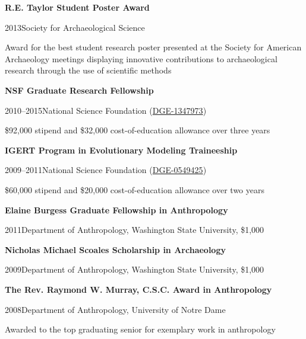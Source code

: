 {\bf R.E. Taylor Student Poster Award}
\begin{list1}
\item[] 2013\hspace{.2cm}Society for Archaeological Science
\item[] Award for the best student research poster presented at the Society for American Archaeology meetings displaying innovative contributions to archaeological research through the use of scientific methods
\end{list1}


{\bf NSF Graduate Research Fellowship}
\begin{list1}
\item[] 2010–2015\hspace{.2cm}National Science Foundation (\href{https://www.nsf.gov/awardsearch/showAward?AWD_ID=1347973}{DGE-1347973})
\item[] \$92,000 stipend and \$32,000 cost-of-education allowance over three years
\end{list1}


{\bf IGERT Program in Evolutionary Modeling Traineeship}
\begin{list1}
\item[] 2009–2011\hspace{.2cm}National Science Foundation (\href{https://grantome.com/grant/NSF/DGE-0549425}{DGE-0549425})
\item[] \$60,000 stipend and \$20,000 cost-of-education allowance over two years
\end{list1}


{\bf Elaine Burgess Graduate Fellowship in Anthropology} 
\begin{list1}
\item[] 2011\hspace{.2cm}Department of Anthropology, Washington State University, \$1,000
\end{list1}


{\bf Nicholas Michael Scoales Scholarship in Archaeology}
\begin{list1}
\item[] 2009\hspace{.2cm}Department of Anthropology, Washington State University, \$1,000
\end{list1}


{\bf The Rev. Raymond W. Murray, C.S.C. Award in Anthropology}
\begin{list1}
\item[] 2008\hspace{.2cm}Department of Anthropology, University of Notre Dame
\item[] Awarded to the top graduating senior for exemplary work in anthropology
\end{list1}


